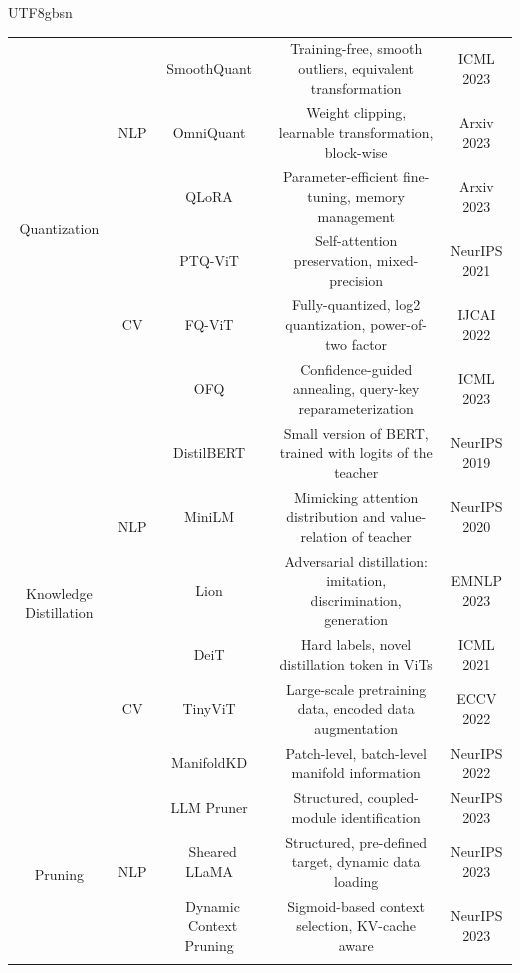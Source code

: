 \documentclass[10pt,journal,compsoc]{IEEEtran}
\newcommand{\<}{\left\langle}
\renewcommand{\>}{\right\rangle}
\newcommand{\1}{\mathbbm{1}}
\begin{document}
\begin{CJK}{UTF8}{gbsn}
\begin{table}[htb]
{\begin{tabular}{c|c|c|c|c}
			\multirow{6}{*}{{Quantization}} & \multirow{3}{*}{NLP}  &SmoothQuant~\cite{xiao2023smoothquant}  & Training-free, smooth outliers, equivalent transformation & ICML 2023  \\
			& &OmniQuant~\cite{shao2023omniquant} & Weight clipping, learnable transformation, block-wise & Arxiv 2023  \\
			&	& QLoRA~\cite{dettmers2023qlora} & Parameter-efficient fine-tuning, memory management & Arxiv 2023  \\  \cline{2-5}
			& \multirow{3}{*}{CV}  & PTQ-ViT~\cite{liu2021post}  & Self-attention preservation, mixed-precision & NeurIPS 2021 \\
			& &FQ-ViT~\cite{lin2021fq}  & Fully-quantized, log2 quantization, power-of-two factor & IJCAI 2022  \\
			& &OFQ~\cite{liu2023oscillation} & Confidence-guided annealing, query-key reparameterization  & ICML 2023  \\  \hline \hline
			\multirow{6}{*}{{Knowledge Distillation}} & \multirow{3}{*}{NLP}  & DistilBERT~\cite{sanh2019distilbert} & Small version of BERT, trained with logits of the teacher & NeurIPS 2019  \\
			& & MiniLM~\cite{wang2020minilm} & Mimicking attention distribution and value-relation of teacher & NeurIPS 2020  \\
			&	& Lion~\cite{jiang2023lion} & Adversarial distillation: imitation, discrimination, generation & EMNLP 2023 \\  \cline{2-5}
			& \multirow{3}{*}{CV} & DeiT~\cite{Touvron2020TrainingDI} & Hard labels, novel distillation token in ViTs & ICML 2021  \\
			& & TinyViT~\cite{wu2022tinyvit} & Large-scale pretraining data, encoded data augmentation & ECCV 2022  \\
			& & ManifoldKD~\cite{hao2022learning} & Patch-level, batch-level manifold information & NeurIPS 2022  \\  \hline \hline
						\multirow{5}{*}{{Pruning}} & \multirow{3}{*}{NLP}  
			&LLM Pruner~\cite{Ma2023LLMPrunerOT} & Structured, coupled-module identification & NeurIPS 2023 \\
			&	& Sheared LLaMA~\cite{Xia2023ShearedLA} & Structured, pre-defined target, dynamic data loading & NeurIPS 2023  \\ %
			&	&Dynamic Context Pruning~\cite{Anagnostidis2023DynamicCP}  & Sigmoid-based context selection, KV-cache aware & NeurIPS 2023  \\ \cline{2-5}

\end{tabular}}
\end{table}
\end{CJK}
\end{document}

